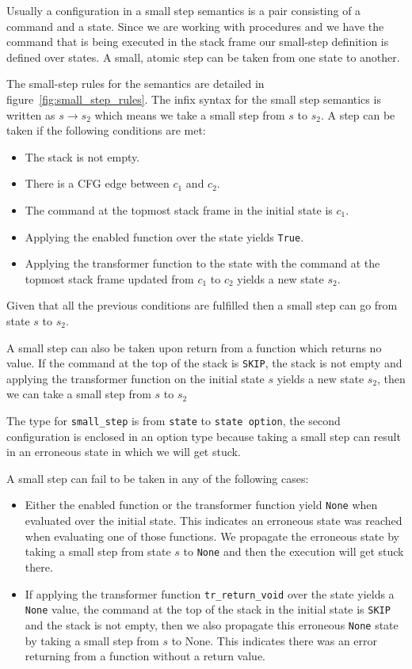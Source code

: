 Usually a configuration in a small step semantics is a pair consisting of a command and a state.
Since we are working with procedures and we have the command that is being executed in the stack frame our small-step definition is defined over states.
A small, atomic step can be taken from one state to another.

The small-step rules for the semantics are detailed in figure~\ref{fig:small_step_rules}.
The infix syntax for the small step semantics is written as $s \rightarrow s_{2}$ which means we take a small step from $s$ to $s_{2}$.
A step can be taken if the following conditions are met:

\begin{itemize}
  \item{The stack is not empty.}
  \item{There is a CFG edge between $c_{1}$ and $c_{2}$.}
  \item{The command at the topmost stack frame in the initial state is $c_{1}$.}
  \item{Applying the enabled function over the state yields \verb|True|.}
  \item{Applying the transformer function to the state with the command at the topmost stack frame updated from $c_{1}$ to $c_{2}$ yields a new state $s_{2}$.}
\end{itemize}

Given that all the previous conditions are fulfilled then a small step can go from state $s$ to $s_{2}$.

A small step can also be taken upon return from a function which returns no value.
If the command at the top of the stack is \verb|SKIP|, the stack is not empty and applying the transformer function on the initial state $s$ yields a new state $s_{2}$, then we can take a small step from $s$ to $s_{2}$

The type for \verb|small_step| is from \verb|state| to \verb|state option|, the second configuration is enclosed in an option type because taking a small step can result in an erroneous state in which we will get stuck.

A small step can fail to be taken in any of the following cases:

\begin{itemize}
  \item{Either the enabled function or the transformer function yield \verb|None| when evaluated over the initial state.
  This indicates an erroneous state was reached when evaluating one of those functions.
  We propagate the erroneous state by taking a small step from state $s$ to \verb|None| and then the execution will get stuck there.}
  \item{If applying the transformer function \verb|tr_return_void| over the state yields a \verb|None| value, the command at the top of the stack in the initial state is \verb|SKIP| and the stack is not empty, then we also propagate this erroneous \verb|None| state by taking a small step from $s$ to None.
  This indicates there was an error returning from a function without a return value.}
\end{itemize}

